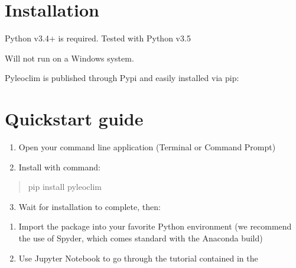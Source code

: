 \documentclass[letterpaper,10pt,english]{sphinxmanual}
\begin{document}
\section{Installation}
\label{\detokenize{Introduction:installation}}
Python v3.4+ is required. Tested with Python v3.5

Will not run on a Windows system.

Pyleoclim is published through Pypi and easily installed via pip:

\begin{sphinxVerbatim}[commandchars=\\\{\}]
  
\end{sphinxVerbatim}


\section{Quickstart guide}
\label{\detokenize{Introduction:quickstart-guide}}\begin{enumerate}
\item {} 
Open your command line application (Terminal or Command Prompt)

\item {} 
Install with command:

\end{enumerate}
\begin{quote}

pip install pyleoclim
\end{quote}
\begin{enumerate}
\setcounter{enumi}{2}
\item {} 
Wait for installation to complete, then:

\end{enumerate}
\begin{enumerate}
\item {} 
Import the package into your favorite Python environment (we recommend the use of Spyder, which comes standard with the Anaconda build)

\item {} 
Use Jupyter Notebook to go through the tutorial contained in the 

\end{enumerate}
\end{document}

